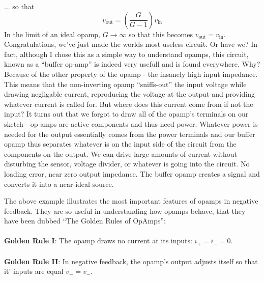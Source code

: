 \documentclass[]{article}
\begin{document}
\noindent ... so that 
\begin{equation}
\label{eq:opamp_analysis_feedback}
v_\text{out} = \left(\frac{G}{G-1}\right)v_\text{in}
\end{equation}
In the limit of an ideal opamp, $G\rightarrow\infty$ so that this becomes $v_\text{out} = v_\text{in}$. Congratulations, we've just made the worlds most useless circuit. Or have we? In fact, although I chose this as a simple way to understand opamps, this circuit, known as a ``buffer op-amp'' is indeed very usefull and is found everywhere. Why? Because of the other property of the opamp - the insanely high input impedance. This means that the non-inverting opamp ``sniffs-out'' the input voltage while drawing negligable current, reproducing the voltage at the output and providing whatever current is called for. But where does this current come from if not the input? It turns out that we forgot to draw all of the opamp's terminals on our sketch - op-amps are active components and thus need power. Whatever power is needed for the output essentially comes from the power terminals and our buffer opamp thus separates whatever is on the input side of the circuit from the components on the output. We can drive large amounts of current without disturbing the sensor, voltage divider, or whatever is going into the circuit. No loading error, near zero output impedance. The buffer opamp creates a signal and converts it into a near-ideal source.

The above example illustrates the most important features of opamps in negative feedback. They are so useful in understanding how opamps behave, that they have been dubbed ``The Golden Rules of OpAmps'':
\\\\
\textbf{Golden Rule I}: The opamp draws no current at its inputs: $i_+ = i_- = 0$.
\\\\
\textbf{Golden Rule II}: In negative feedback, the opamp's output adjusts itself so that it' inputs are equal $v_+ = v_-$.
\end{document}
